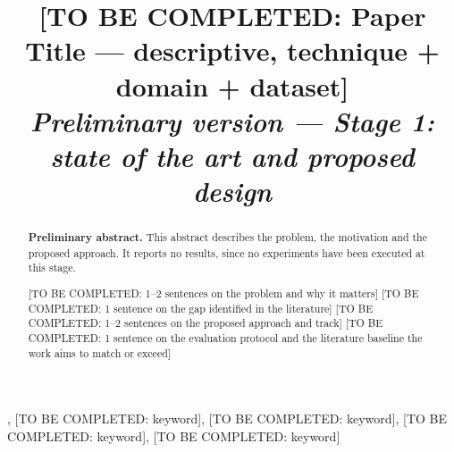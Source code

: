 \documentclass[conference]{IEEEtran}
\begin{document}
\title{[TO BE COMPLETED: Paper Title --- descriptive, technique + domain + dataset]\\
{\footnotesize \textit{Preliminary version --- Stage 1: state of the art and proposed design}}}

\author{
\and
{}
\and
{}
}

\maketitle

\begin{abstract}
\textbf{Preliminary abstract.} This abstract describes the problem, the
motivation and the proposed approach. It reports no results, since no
experiments have been executed at this stage.

[TO BE COMPLETED: 1--2 sentences on the problem and why it matters]
[TO BE COMPLETED: 1 sentence on the gap identified in the literature]
[TO BE COMPLETED: 1--2 sentences on the proposed approach and track]
[TO BE COMPLETED: 1 sentence on the evaluation protocol and the
literature baseline the work aims to match or exceed]
\end{abstract}

\begin{IEEEkeywords}
, [TO BE COMPLETED: keyword],
[TO BE COMPLETED: keyword], [TO BE COMPLETED: keyword],
[TO BE COMPLETED: keyword]
\end{IEEEkeywords}




\end{document}
